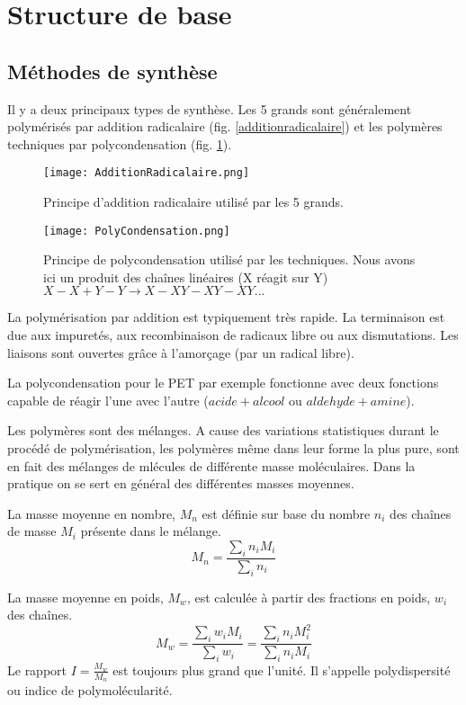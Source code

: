 \documentclass[../main.tex]{subfiles}
\begin{document}
		\section{Structure de base}
		\subsection{Méthodes de synthèse}
		Il y a deux principaux types de synthèse. Les 5 grands sont généralement polymérisés par addition radicalaire (fig. \ref{additionradicalaire}) et les polymères techniques par polycondensation (fig. \ref{polycondensation}).
		
		\begin{figure}[h]
			\begin{center}		
			\texttt{[image: AdditionRadicalaire.png]}
			\caption{\label{additionradicalaire} Principe d'addition radicalaire utilisé par les 5 grands.}
			\texttt{[image: PolyCondensation.png]}
			\caption{\label{polycondensation} Principe de polycondensation utilisé par les techniques. Nous avons ici un produit des chaînes linéaires (X réagit sur Y) $X-X + Y-Y  \rightarrow X-XY-XY-XY...$} 
			\end{center}
		\end{figure}
		La polymérisation par addition est typiquement très rapide. La terminaison est due aux impuretés, aux recombinaison de radicaux libre ou aux dismutations. Les liaisons sont ouvertes grâce à l'amorçage (par un radical libre).
		
		La polycondensation pour le PET par exemple fonctionne avec deux fonctions capable de réagir l'une avec l'autre ($acide + alcool$ ou $aldehyde + amine$).
		
		Les polymères sont des mélanges. A cause des variations statistiques durant le procédé de polymérisation, les polymères même dans leur forme la plus pure, sont en fait des mélanges de mlécules de différente masse moléculaires. 
		Dans la pratique on se sert en général des différentes masses moyennes.
		
		La masse moyenne en nombre, $M_n$ est définie sur base du nombre $n_i$ des chaînes de masse $M_i$ présente dans le mélange. 
		\begin{equation}
			M_n = \frac{\sum_{i}n_iM_i}{\sum_{i}n_i} 
		\end{equation}
		
		La masse moyenne en poids, $M_w$, est calculée à partir des fractions en poids, $w_i$ des chaînes.
		\begin{equation}
			M_w = \frac{\sum_{i}w_iM_i}{\sum_{i}w_i} =  \frac{\sum_{i}n_iM_i^2}{\sum_{i}n_iM_i}
		\end{equation}
		Le rapport $I = \frac{M_w}{M_n}$ est toujours plus grand que l'unité. Il s'appelle polydispersité ou indice de polymolécularité. 
		
\end{document}
